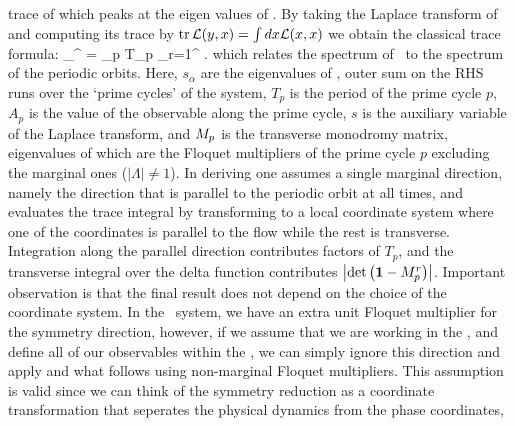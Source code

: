 \eeq
trace of which peaks at the eigen values of \Aop. By taking the
Laplace transform of  and computing its trace
by $\mbox{\rm tr}\, {\cal L} (y,x) = \int dx {\cal L} (x,x)$ we obtain the
classical trace formula:
\beq
\sum_{}^{\infty}  = \sum_p T_p
\sum_{r=1}^{\infty}  .
which relates the spectrum of \Aop\ to the spectrum of the periodic
orbits. Here, $s_{\alpha}$ are the eigenvalues of \Aop ,
outer sum on the RHS runs over the `prime cycles' of the system,
$T_p$ is the period of the prime cycle $p$, $A_p$ is the value of
the observable along the prime cycle, $s$ is the auxiliary
variable of the Laplace transform, and $M_p$ is the transverse
monodromy matrix, eigenvalues of which are the Floquet multipliers of the prime
cycle $p$ excluding the marginal ones ($|\Lambda| \neq 1$). In deriving
 one assumes a single marginal direction, namely
the direction that is parallel to the periodic orbit at all times, and evaluates
the trace integral by transforming to a local coordinate system where one of the
coordinates is parallel to the flow while the rest is transverse. Integration along
the parallel direction contributes factors of $T_p$, and the transverse integral
over the delta function contributes $\left|\mbox{\rm det}\,\!\left({\bf 1}-M_p^{r}\right)\right|$. Important observation is that
the final result  does not depend on the choice
of the coordinate system. In the \twomode\ system, we have an extra unit Floquet
multiplier for the symmetry direction, however, if we assume that we are working
in the \slice , and define all of our observables within the \slice , we can
simply ignore this direction and apply  and what
follows using non-marginal Floquet multipliers. This assumption is valid since
we can think of the symmetry reduction as a coordinate transformation that 
seperates the physical dynamics from the phase coordinates, 

